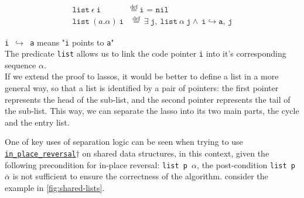 \documentclass[11pt,a4paper]{article}
\begin{document}
\begin{align*}
\texttt{list}\ \epsilon\ \texttt{i} &\overset{\text{def}}{=}\ \texttt{i = nil} \\
\texttt{list}\ (a.\alpha)\ \texttt{i} &\overset{\text{def}}{=}\ \exists\ \texttt{j},\ \texttt{list}\ \alpha\ \texttt{j} \land\ \texttt{i} \hookrightarrow \texttt{a, j}
\end{align*}


\texttt{i $\hookrightarrow$ a} means "\texttt{i} points to \texttt{a}"\\
The predicate \texttt{list} allows us to link the code pointer \texttt{i} into it's corresponding sequence $\alpha$.\\
If we extend the proof to lassos, it would be better to define a list in a more general way, so that a list is identified by a pair of pointers: the first pointer represents the head of the sub-list, and the second pointer represents the tail of the sub-list. This way, we can separate the lasso into its two main parts, the cycle and the entry list.

One of key uses of separation logic can be seen when trying to use \hyperlink{reversal}{\texttt{in\_place\_reversal}$\dagger$} on shared data structures, in this context, given the following precondition for in-place reversal: \texttt{list p $\alpha$}, the post-condition \texttt{list p }$\overline{\alpha}$ is not sufficient to ensure the correctness of the algorithm. consider the example in \autoref{fig:shared-lists}.
\end{document}
